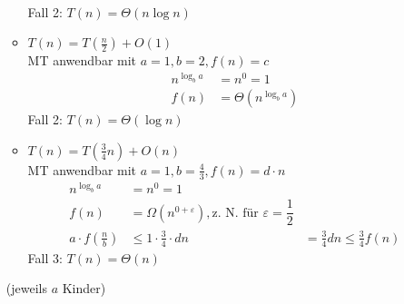 \begin{itemize}
\begin{itemize}
\begin{align*}
                \end{align*}
                Fall 2: $T(n) = \Theta(n \log n)$
        \item   $T(n) = T\left(\frac{n}{2}\right) + O(1)$ \\
                MT anwendbar mit $a = 1, b = 2, f(n) = c$
                \begin{align*}
                 n^{\log_b a} &= n^0 = 1\\
                 f(n) &= \Theta(n^{\log_b a})
                \end{align*}
                Fall 2: $T(n) = \Theta(\log n)$
        \item   $T(n) = T\left(\frac{3}{4}n\right) + O(n)$\\
                MT anwendbar mit $a = 1, b = \frac{4}{3}, f(n) = d \cdot n$\\
                \begin{align*}
                 n^{\log_b a} &= n^0 = 1 \\
                 f(n) &= \Omega(n^{0+\varepsilon}), \text{z. N. für $\varepsilon = \dfrac{1}{2}$} \\
                 a \cdot f\left(\frac{n}{b}\right) &\leq 1 \cdot \frac{3}{4} \cdot dn
                    &= \frac{3}{4} d n \leq \frac{3}{4} f(n)
                \end{align*}
                Fall 3: $T(n) = \Theta(n)$
        \end{itemize}
        \Bew
            \begin{center}
             \begin{minipage}{0.4\textwidth}
            \centering
        (jeweils $a$ Kinder)
        \end{minipage}

\end{center}
\end{itemize}
